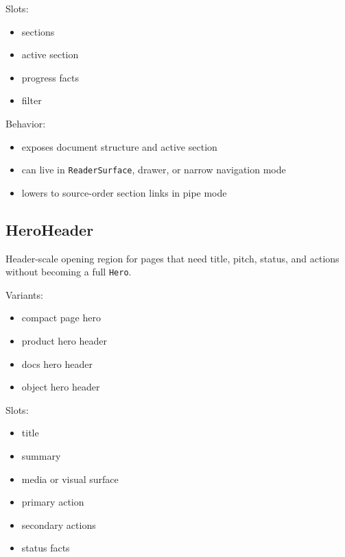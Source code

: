 Slots:

\begin{itemize}
\tightlist
\item
  sections
\item
  active section
\item
  progress facts
\item
  filter
\end{itemize}

Behavior:

\begin{itemize}
\tightlist
\item
  exposes document structure and active section
\item
  can live in \texttt{R\allowbreak{}e\allowbreak{}a\allowbreak{}d\allowbreak{}e\allowbreak{}r\allowbreak{}S\allowbreak{}u\allowbreak{}r\allowbreak{}f\allowbreak{}a\allowbreak{}c\allowbreak{}e}, drawer, or narrow navigation mode
\item
  lowers to source-order section links in pipe mode
\end{itemize}

\subsection{HeroHeader}\label{record-128-heroheader}

Header-scale opening region for pages that need title, pitch, status, and actions without becoming a full \texttt{H\allowbreak{}e\allowbreak{}r\allowbreak{}o}.

Variants:

\begin{itemize}
\tightlist
\item
  compact page hero
\item
  product hero header
\item
  docs hero header
\item
  object hero header
\end{itemize}

Slots:

\begin{itemize}
\tightlist
\item
  title
\item
  summary
\item
  media or visual surface
\item
  primary action
\item
  secondary actions
\item
  status facts
\end{itemize}

